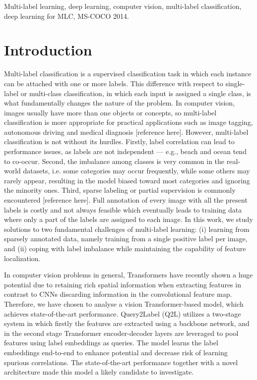 \documentclass[lettersize,journal]{IEEEtran}
\begin{document}
\begin{IEEEkeywords}
Multi-label learning, deep learning, computer vision, multi-label
classification, deep learning for MLC, MS-COCO 2014. 

\end{IEEEkeywords}


\section{Introduction}

Multi-label classification is a supervised classification task in which each instance can be attached with one or more labels. This difference with respect to single-label or multi-class classification, in which each input is assigned a single class, is what fundamentally changes the nature of the problem. In computer vision, images usually have more than one objects or concepts, so multi-label classification is more appropriate for practical applications such as image tagging, autonomous driving and medical diagnosis [reference here].
However, multi-label classification is not without its hurdles. Firstly, label correlation can lead to performance issues, as labels are not independent — e.g., beach and ocean tend to co-occur. Second, the imbalance among classes is very common in the real-world datasets, i.e. some categories may occur frequently, while some others may rarely appear, resulting in the model biased toward most categories and ignoring the minority ones. Third, sparse labeling or partial supervision is commonly encountered [reference here]. Full annotation of every image with all the present labels is costly and not always feasible which eventually leads to training data where only a part of the labels are assigned to each image.
In this work, we study solutions to two fundamental challenges of multi-label learning: (i) learning from sparsely annotated data, namely training from a single positive label per image, and (ii) coping with label imbalance while maintaining the capability of feature localization. 

In computer vision problems in general, Transformers have recently shown a huge potential due to retaining rich spatial information when extracting features in contrast to CNNs discarding information in the convolutional feature map. Therefore, we have chosen to analyse a vision Transformer-based model, which achieves state-of-the-art performance. Query2Label (Q2L) utilizes a two-stage system in which firstly the features are extracted using a backbone network, and in the second stage Transformer encoder-decoder layers are leveraged to pool features using label embeddings as queries. The model learns the label embeddings end-to-end to enhance potential and decrease risk of learning spurious correlations. The state-of-the-art performance together with a novel architecture made this model a likely candidate to investigate. 
\end{document}
